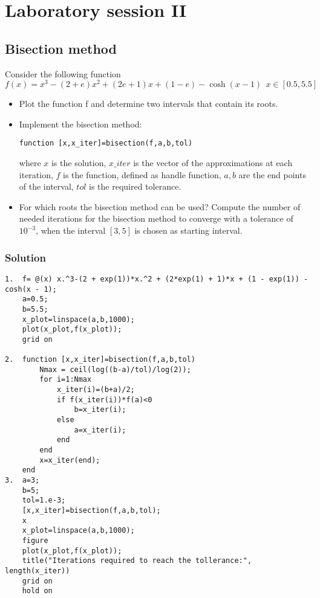 \documentclass[12pt, a4paper]{report}
\begin{document}
\newpage

\chapter{Laboratory session II}
    \section{Bisection method}
        Consider the following function
        \[f(x) = x^3-(2+e)x^2+(2e+1)x+(1-e)-\cosh(x-1) \:\: x \in [0.5, 5.5]\]
        \begin{itemize}
            \item Plot the function f and determine two intervals that contain its roots.
            \item Implement the bisection method:
                \begin{lstlisting}[style=Matlab]
function [x,x_iter]=bisection(f,a,b,tol)
                \end{lstlisting}
                where $x$ is the solution, $x\_iter$ is the vector of the approximations at each iteration, $f$ is the function, defined as handle function, $a,b$ are the end points 
                of the interval, $tol$ is the required tolerance.
            \item For which roots the bisection method can be used? Compute the number of needed iterations for the bisection method to converge with a tolerance of $10^{-3}$, 
                when the interval $[3, 5]$ is chosen as starting interval.
        \end{itemize}
    \subsection*{Solution}
        \begin{lstlisting}[style=Matlab]
1.  f= @(x) x.^3-(2 + exp(1))*x.^2 + (2*exp(1) + 1)*x + (1 - exp(1)) - cosh(x - 1);
    a=0.5;
    b=5.5;
    x_plot=linspace(a,b,1000);
    plot(x_plot,f(x_plot));
    grid on

2.  function [x,x_iter]=bisection(f,a,b,tol)
        Nmax = ceil(log((b-a)/tol)/log(2));
        for i=1:Nmax
            x_iter(i)=(b+a)/2;
            if f(x_iter(i))*f(a)<0
                b=x_iter(i);
            else
                a=x_iter(i);
            end
        end
        x=x_iter(end);
    end
3.  a=3;
    b=5;
    tol=1.e-3;
    [x,x_iter]=bisection(f,a,b,tol);
    x
    x_plot=linspace(a,b,1000);
    figure
    plot(x_plot,f(x_plot));
    title("Iterations required to reach the tollerance:", length(x_iter))
    grid on
    hold on
        \end{lstlisting}  
\end{document}
